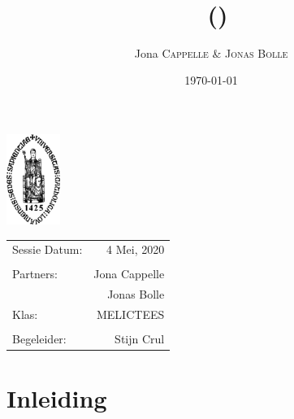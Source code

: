 \documentclass[11pt,twoside,a4paper]{article}
\title{\maintitle \\ \course \\{\small\ (\coursenumber)}} %
\author{Jona \textsc{Cappelle} \& \textsc{Jonas Bolle}} %
\date{\today} %
\newcommand{\class}{MELICTEES}
\begin{document}
\sloppy %
\begin{titlepage}
\maketitle %

\vfill
\begin{center}
\includegraphics[width=0.13\textwidth]{logo_kuleuven.png} %
\end{center}
\vfill
\vfill
\vfill

\begin{center}
\begin{tabular}{l r}
Sessie Datum: & 4 Mei, 2020 \\ %
\\
Partners: &  Jona Cappelle\\ %
&  Jonas Bolle\\
Klas: & \class \\
\\
Begeleider: &  Stijn Crul%
\end{tabular}
\end{center}
\vfill
\vfill
\end{titlepage}
\clearpage
\newpage\null\thispagestyle{empty}\newpage %



\restoregeometry%

\tableofcontents
\listoffigures
\listoftables
\listoflistings
\clearpage

\section{Inleiding}
\end{document}

